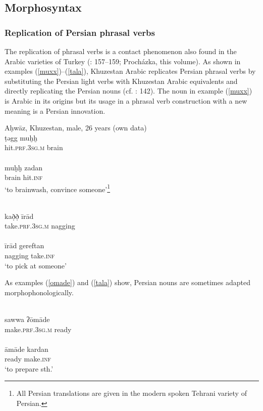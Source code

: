 \documentclass[output=paper,nonflat]{langsci/langscibook}
\begin{document}
\subsection{Morphosyntax}
\subsubsection{Replication of Persian phrasal verbs}

The replication of phrasal verbs is a contact phenomenon also found in the Arabic varieties of Turkey (\citealt{Grigore2007book}: 157–159; Procházka, this volume). As shown in examples (\ref{muxx})--(\ref{tala}), Khuzestan Arabic replicates Persian phrasal verbs by substituting the Persian light verbs with Khuzestan Arabic equivalents and directly replicating the Persian nouns (cf. \citealt{MatrasShabibi2007}: 142). The noun in example (\ref{muxx}) is Arabic in its origins but its usage in a phrasal verb construction with a new meaning is a Persian innovation.

\ea\label{ex:key:} \label{muxx}
\ea Aḥwāz, Khuzestan, male, 26 years (own data)\\
\gll ṭəgg muḫḫ\\
     hit.\textsc{prf}.3\textsc{sg}.\textsc{m} brain\\ 
\\
\gll muḫḫ zadan\\
     brain hit.\textsc{inf} \\
\glt ‘to brainwash, convince someone’\footnote{All Persian translations are given in the modern spoken Tehrani variety of Persian.} 
\z
\z

\ea\label{ex:key:} \label{irad}
\\
\gll kað̣ð̣ īrād\\
     take.\textsc{prf}.3\textsc{sg}.\textsc{m} nagging\\ 
\\
\gll īrād gereftan\\
     nagging take.\textsc{inf}\\
\glt ‘to pick at someone’ 
\z\z

 As examples (\ref{omade}) and (\ref{tala}) show, Persian nouns are sometimes adapted morphophonologically.

\ea\label{ex:key:} \label{omade}
\\
\gll sawwa ʔōmāde\\
     make.\textsc{prf}.3\textsc{sg}.\textsc{m} ready\\ 
\\
\gll āmāde kardan \\
     ready make.\textsc{inf}\\
\glt ‘to prepare sth.’
\z\z
\end{document}
